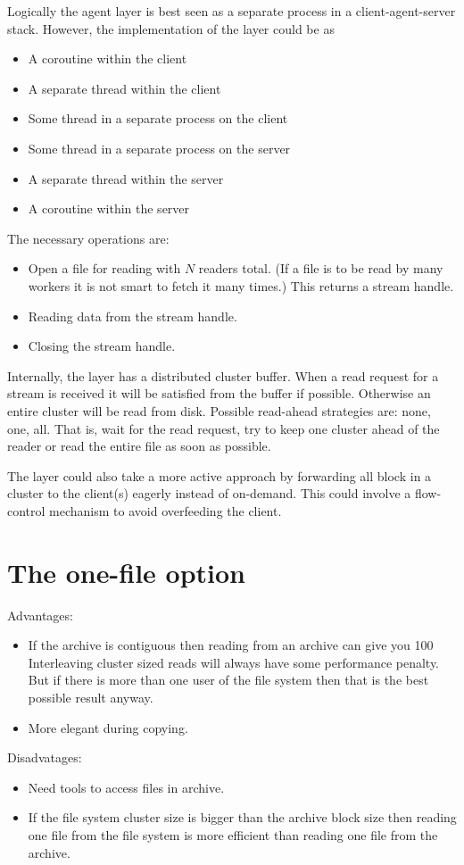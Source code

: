 \documentclass{article}
\begin{document}
Logically the agent layer is best seen as a separate process in a
client-agent-server stack. However, the implementation of the layer could be as
\begin{itemize}
\item A coroutine within the client
\item A separate thread within the client
\item Some thread in a separate process on the client
\item Some thread in a separate process on the server
\item A separate thread within the server
\item A coroutine within the server
\end{itemize}

The necessary operations are:
\begin{itemize}
\item Open a file for reading with $N$ readers total.
(If a file is to be read by many workers it is not smart to fetch it many times.)
This returns a stream handle.
\item Reading data from the stream handle.
\item Closing the stream handle.
\end{itemize}

Internally, the layer has a distributed cluster buffer.
When a read request for a stream is received it will be satisfied from the buffer if possible.
Otherwise an entire cluster will be read from disk. Possible read-ahead strategies are:
none, one, all. That is, wait for the read request, try to keep one cluster ahead of the reader or
read the entire file as soon as possible.

The layer could also take a more active approach by forwarding all block in a cluster to the client(s)
eagerly instead of on-demand. This could involve a flow-control mechanism to avoid overfeeding the client.


\section{The one-file option}

Advantages:
\begin{itemize}
\item If the archive is contiguous then reading from an archive can give you 100%
Interleaving cluster sized reads will always have some performance penalty.
But if there is more than one user of the file system then that is the best possible result anyway.
\item More elegant during copying.
\end{itemize}
Disadvatages:
\begin{itemize}
\item Need tools to access files in archive.
\item If the file system cluster size is bigger than the archive block size then
reading one file from the file system is more efficient than reading one file from the archive.
\end{itemize}
\end{document}
